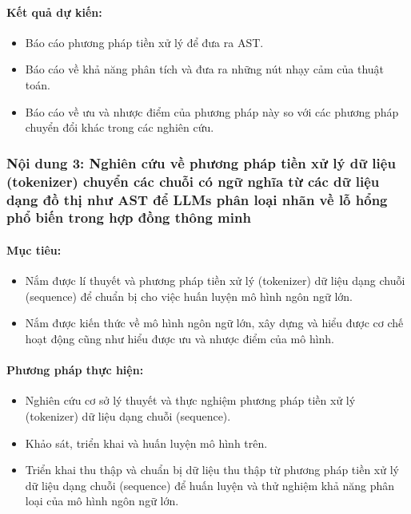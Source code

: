 \documentclass[letterpaper]{article}
\begin{document}
\paragraph{Kết quả dự kiến:}
\begin{itemize}
    \item Báo cáo phương pháp tiền xử lý để đưa ra AST.
    \item Báo cáo về khả năng phân tích và đưa ra những nút nhạy cảm của thuật toán.
    \item Báo cáo về ưu và nhược điểm của phương pháp này so với các phương pháp chuyển đổi khác trong các nghiên cứu.
\end{itemize}

\subsubsection{Nội dung 3: Nghiên cứu về phương pháp tiền xử lý dữ liệu (tokenizer) chuyển các chuỗi có ngữ nghĩa từ các dữ liệu dạng đồ thị như AST để LLMs phân loại nhãn về lỗ hổng phổ biến trong hợp đồng thông minh}

\paragraph{Mục tiêu:}

\begin{itemize}
    \item Nắm được lí thuyết và phương pháp tiền xử lý (tokenizer) dữ liệu dạng chuỗi (sequence) để chuẩn bị cho việc huấn luyện mô hình ngôn ngữ lớn.
    \item Nắm được kiến thức về mô hình ngôn ngữ lớn, xây dựng và hiểu được cơ chế hoạt động cũng như hiểu được ưu và nhược điểm của mô hình.
\end{itemize}

\paragraph{Phương pháp thực hiện:}
\begin{itemize}
    \item Nghiên cứu cơ sở lý thuyết và thực nghiệm phương pháp tiền xử lý (tokenizer) dữ liệu dạng chuỗi (sequence).
    \item Khảo sát, triển khai và huấn luyện mô hình trên.
    \item Triển khai thu thập và chuẩn bị dữ liệu thu thập từ phương pháp tiền xử lý dữ liệu dạng chuỗi (sequence) để huấn luyện và thử nghiệm khả năng phân loại của mô hình ngôn ngữ lớn.
\end{itemize}
\end{document}
